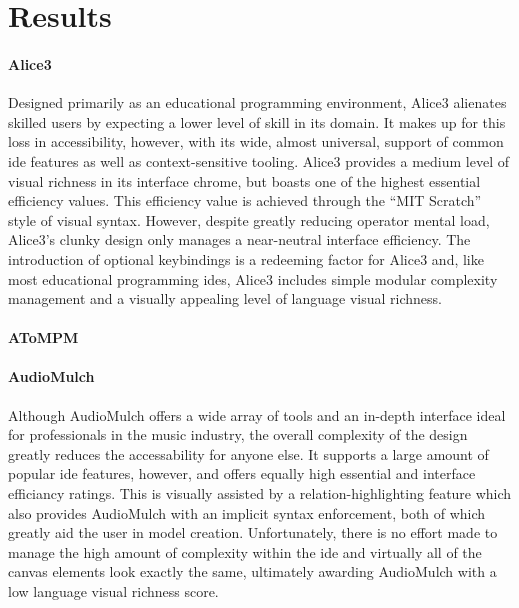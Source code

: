 \section{Results}
\label{sec:results}


\paragraph{Alice3} Designed primarily as an educational programming
environment, Alice3 alienates skilled users by expecting a lower level of
skill in its domain. It makes up for this loss in accessibility, however,
with its wide, almost universal, support of common \ac{ide} features as
well as context-sensitive tooling. Alice3 provides a medium level of visual
richness in its interface chrome, but boasts one of the highest essential
efficiency values. This efficiency value is achieved through the ``MIT
Scratch'' style of visual syntax. However, despite greatly reducing
operator mental load, Alice3's clunky design only manages a near-neutral
interface efficiency. The introduction of optional keybindings is a
redeeming factor for Alice3 and, like most educational programming
\acp{ide}, Alice3 includes simple modular complexity management and a
visually appealing level of language visual richness.

\paragraph{AToMPM}

\paragraph{AudioMulch} Although AudioMulch offers a wide array of tools and an in-depth interface ideal for professionals in the music industry, the overall complexity of the design greatly reduces the accessability for anyone else. It supports a large amount of popular \ac{ide} features, however, and offers equally high essential and interface efficiancy ratings.  This is visually assisted by a relation-highlighting feature which also provides AudioMulch with an implicit syntax enforcement, both of which greatly aid the user in model creation. Unfortunately, there is no effort made to manage the high amount of complexity within the \ac{ide} and virtually all of the canvas elements look exactly the same, ultimately awarding AudioMulch with a low language visual richness score.

